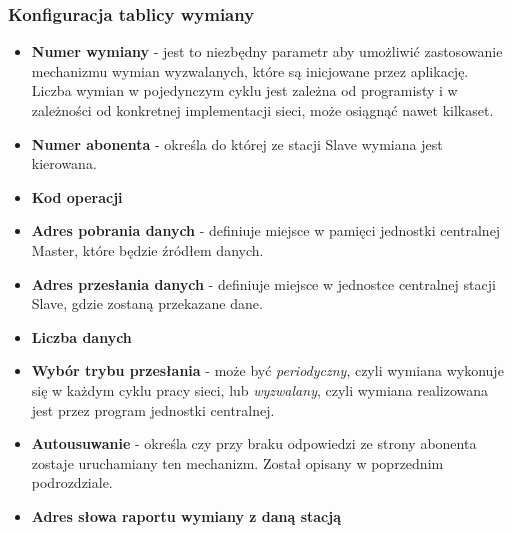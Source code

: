 \documentclass[a4paper,twoside]{article}
\begin{document}
	\subsubsection{Konfiguracja tablicy wymiany}
	\begin{itemize}
		\item \textbf{Numer wymiany} - jest to niezbędny parametr aby umożliwić zastosowanie mechanizmu wymian wyzwalanych, które są inicjowane przez aplikację. Liczba wymian w pojedynczym cyklu jest zależna od programisty i w zależności od konkretnej implementacji sieci, może osiągnąć nawet kilkaset.
		\item \textbf{Numer abonenta} - określa do której ze stacji Slave wymiana jest kierowana.
		\item \textbf{Kod operacji}
		\item \textbf{Adres pobrania danych} - definiuje miejsce w pamięci jednostki centralnej Master, które będzie źródłem danych.
		\item \textbf{Adres przesłania danych} - definiuje miejsce w jednostce centralnej stacji Slave, gdzie zostaną przekazane dane.
		\item \textbf{Liczba danych}
		\item \textbf{Wybór trybu przesłania} - może być \textit{periodyczny}, czyli wymiana wykonuje się w każdym cyklu pracy sieci, lub \textit{wyzwalany}, czyli wymiana realizowana jest przez program jednostki centralnej.
		\item \textbf{Autousuwanie} - określa czy przy braku odpowiedzi ze strony abonenta zostaje uruchamiany ten mechanizm. Został opisany w poprzednim podrozdziale.
		\item \textbf{Adres słowa raportu wymiany z daną stacją}
	\end{itemize}
\end{document}
